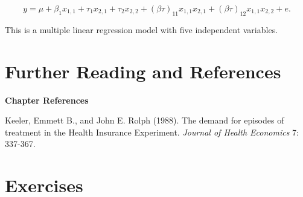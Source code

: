 \begin{equation*}
y=\mu +\beta_1x_{1,1}+\tau_1x_{2,1}+\tau_2x_{2,2}+(\beta \tau
)_{11}x_{1,1}x_{2,1}+(\beta \tau )_{12}x_{1,1}x_{2,2}+e.
\end{equation*}

\noindent This is a multiple linear regression model with five
independent variables.



\section{Further Reading and References}


\textbf{Chapter References}

\begin{multicols}{2}


Keeler, Emmett B., and  John E. Rolph (1988). The demand for
episodes of treatment in the Health Insurance Experiment.
\emph{Journal of Health Economics} 7: 337-367.



\end{multicols}

\bigskip


\section{Exercises}


